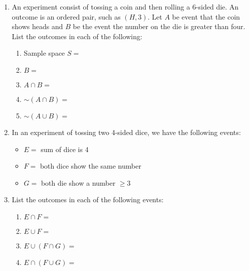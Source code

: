 \documentclass{article}
\newcommand{\comp}{{\sim}}			%
\begin{document}
\begin{enumerate}
    \item An experiment consist of tossing a coin and then rolling a 6-sided die. An outcome is an ordered pair, such as $(H, 3)$. Let $A$ be event that the coin shows heads and $B$ be the event the number on the die is greater than four. List the outcomes in each of the following:\bigskip%
    \begin{enumerate}
        \item Sample space $S = $\vspace{40pt}
        \item $B = $\vspace{40pt}
        \item $A \cap B = $\vspace{40pt}
        \item $\comp (A \cap B) = $\vspace{40pt}
        \item $\comp (A \cup B) = $\vspace{40pt}
    \end{enumerate}\bigskip
    
    \item In an experiment of tossing two 4-sided dice, we have the following events:
    \begin{itemize}%
        \item $E = $ sum of dice is 4
        \item $F = $ both dice show the same number
        \item $G = $ both die show a number $\ge 3$ 
    \end{itemize}
    \item[] List the outcomes in each of the following events:\bigskip
    \begin{enumerate}
        \item $E \cap F = $\vspace{60pt}
        \item $E \cup F = $\vspace{60pt}
        \item $E \cup (F \cap G) = $\vspace{60pt}
        \item $E \cap (F \cup G) = $\vspace{60pt}
    \end{enumerate}
\end{enumerate}
\end{document}
